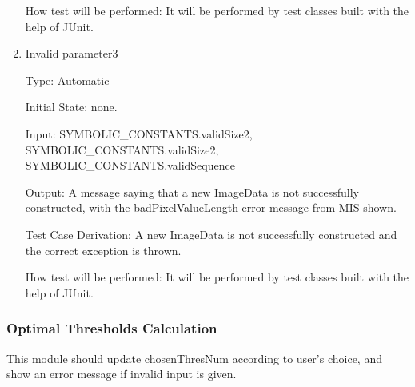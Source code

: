 \documentclass[12pt, titlepage]{article}
\begin{document}
\begin{enumerate}
How test will be performed: It will be performed by test classes built with the
help of JUnit.

\item{Invalid parameter3\\}

Type: Automatic
					
Initial State: none.
					
Input: SYMBOLIC\_CONSTANTS.validSize2, SYMBOLIC\_CONSTANTS.validSize2,
SYMBOLIC\_CONSTANTS.validSequence
					
Output: A message saying that a new ImageData is not successfully constructed,
with the badPixelValueLength error message from MIS shown.

Test Case Derivation: A new ImageData is not successfully constructed and the
correct exception is thrown.

How test will be performed: It will be performed by test classes built with the
help of JUnit.

\end{enumerate}

\subsubsection{Optimal Thresholds Calculation}
\label{sec_ThresCal}

This module should update chosenThresNum according to user's choice, and show an
error message if invalid input is given.
\end{document}
